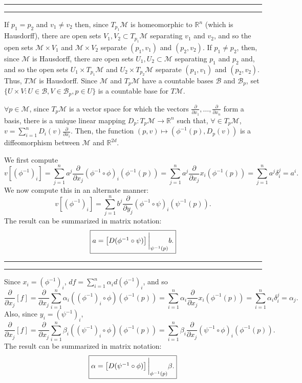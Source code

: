 \documentclass[11pt]{article}
\newcounter{questionCounter}
\newcounter{partCounter}[questionCounter]
\newenvironment{question}[2][\arabic{questionCounter}]{%
    \setcounter{partCounter}{0}%
    \vspace{.25in} \hrule \vspace{0.5em}%
        \noindent{\bf #2}%
    \vspace{0.8em} \hrule \vspace{.10in}%
    \addtocounter{questionCounter}{1}%
}{}
\newcommand{\inv}{^{-1}}                %
\newcommand{\R}{\mathbb{R}}             %
\newcommand{\M}{\mathcal{M}}            %
\newcommand{\B}{\mathcal{B}}            %
\begin{document}
\begin{question}{Problem 2}
If $p_1 = p_2$ and $v_1 \neq v_2$ then, since $T_{p_1}\M$ is homeomorphic to $\R^n$
(which is Hausdorff), there are open sets $V_1,V_2 \subset T_{p_1}\M$
separating $v_1$ and $v_2$, and so the open sets $\M \times V_1$ and $\M \times
V_2$ separate $(p_1,v_1)$ and $(p_2,v_2)$. If $p_1 \neq p_2$, then, since $\M$
is Hausdorff, there are open sets $U_1,U_2 \subset \M$ separating $p_1$ and
$p_2$ and, and so the open sets $U_1 \times T_{p_1}\M$ and
$U_2 \times T_{p_2}\M$ separate $(p_1,v_1)$ and $(p_2,v_2)$. Thus, $T\M$ is
Hausdorff. Since $\M$ and $T_p\M$ have a countable bases $\B$ and $\B_p$,
set $\{U \times V : U \in \B, V \in \B_p, p \in U\}$ is a countable base for
$T\M$.

$\forall p \in \M$, since $T_p\M$ is a vector space for which the vectors
$\frac{\partial}{\partial x_1},\dots,\frac{\partial}{\partial x_n}$ form a
basis, there is a unique linear mapping $D_p : T_p\M \to \R^n$ such that,
$\forall \in T_p\M$, $v = \sum_{i = 1}^n D_i(v) \frac{\partial}{\partial x_i}$.
Then, the function $(p,v) \mapsto (\phi\inv(p),D_p(v))$ is a diffeomorphism
between $\M$ and $\R^{2d}$.

We first compute
\[v\left[\left(\phi\inv\right)_i\right]
 = \sum_{j = 1}^n a^j\frac{\partial}{\partial x_j}
    (\phi\inv \circ \phi)_i (\phi\inv(p))
 = \sum_{j = 1}^n a^j\frac{\partial}{\partial x_j}
    x_i (\phi\inv(p))
 = \sum_{j = 1}^n a^j \delta_i^j
 = a^i.
 \]
We now compute this in an alternate manner:
\[v\left[\left(\phi\inv\right)_i\right]
 = \sum_{j = 1}^n b^j\frac{\partial}{\partial y_j}
    (\phi\inv \circ \psi)_i (\psi\inv(p)).
\]
The result can be summarized in matrix notation:
\[\mbox{\fbox{$a
    = \left[D (\phi\inv \circ \psi)\right] \bigg|_{\psi\inv(p)} b$.}}\]
\end{question}

\begin{question}{Problem 3}
Since $x_i = \left(\phi\inv\right)_i$,
$df = \sum_{i = 1}^n \alpha_i d\left(\phi\inv\right)_i$, and so
\[\frac{\partial}{\partial x_j}[f]
 = \frac{\partial}{\partial x_j}
        \sum_{i = 1}^n \alpha_i \left(\left(\phi\inv\right)_i \circ \phi\right)
            \left( \phi\inv(p) \right)
 = \sum_{i = 1}^n \alpha_i \frac{\partial}{\partial x_j} x_i
            \left( \phi\inv(p) \right)
 = \sum_{i = 1}^n \alpha_i \delta_i^j
 = \alpha_j.
\]
Also, since $y_i = \left(\psi\inv\right)_i$,
\[\frac{\partial}{\partial x_j}[f]
 = \frac{\partial}{\partial x_j}
        \sum_{i = 1}^n \beta_i \left(\left(\psi\inv\right)_i \circ \phi\right)
            \left( \phi\inv(p) \right)
 = \sum_{i = 1}^n \beta_i
        \frac{\partial}{\partial x_j} \left(\psi\inv \circ \phi\right)_i
            \left( \phi\inv(p) \right).
\]
The result can be summarized in matrix notation:
\[\mbox{\fbox{$\alpha
    = \left[D (\psi\inv \circ \phi)\right] \bigg|_{\phi\inv(p)} \beta$.}}\]
\end{question}
\end{document}
